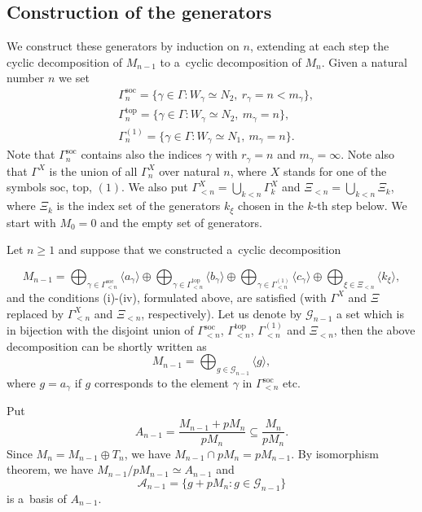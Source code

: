 \documentclass[11pt]{article}
\theoremstyle{definition}
\begin{document}
\subsection{Construction of the generators}

We construct these generators by induction on $n$, extending
at each step the cyclic decomposition of $M_{n-1}$ to a~cyclic decomposition
of $M_n$.
Given a natural number $n$ we set
$$
\begin{aligned}
	&\Gamma_n^{\mathrm{soc}}
	=\{\gamma\in\Gamma:
	W_\gamma\simeq N_2,\ r_\gamma=n<m_\gamma\},\\
	&\Gamma_n^{\mathrm{top}}
	=\{\gamma\in\Gamma:
	W_\gamma\simeq N_2,\ m_\gamma=n\},\\
	&\Gamma_n^{(1)}
	=\{\gamma\in\Gamma:
	W_\gamma\simeq N_1,\ m_\gamma=n\}.
\end{aligned}
$$
Note that $\Gamma_n^{\mathrm{soc}}$ contains also the indices
$\gamma$ with $r_\gamma=n$ and $m_\gamma=\infty$. Note also that $\Gamma^X$ is the union of all $\Gamma^X_n$ over natural $n$, where $X$ stands for one of the symbols $\mathrm{soc}$, $\mathrm{top}$, $(1)$.
	We also put $\Gamma^X_{<n}=\bigcup_{k<n}\Gamma^X_k$ and
	$\Xi_{<n}=\bigcup_{k<n}\Xi_k$, where $\Xi_k$ is the index set of the
	generators $k_\xi$ chosen in the $k$-th step below. 
We start with $M_0=0$ and the empty set of generators.

Let $n\geq1$ and suppose that we constructed a~cyclic
decomposition

$$
		M_{n-1}=\bigoplus_{\gamma\in\Gamma_{<n}^{\mathrm{soc}}}\langle a_{\gamma}\rangle\oplus \bigoplus_{\gamma\in\Gamma_{<n}^{\mathrm{top}}}\langle b_{\gamma}\rangle \oplus \bigoplus_{\gamma\in\Gamma_{<n}^{(1)}}\langle c_{\gamma}\rangle\oplus \bigoplus_{\xi\in\Xi_{<n}}\langle k_{\xi}\rangle,
		$$
		and the conditions (i)-(iv), formulated above, are satisfied (with $\Gamma^X$ and $\Xi$ replaced by $\Gamma^X_{<n}$ and $\Xi_{<n}$, respectively).
	Let us denote by $\mathcal G_{n-1}$ a set which is in bijection with the disjoint union of $\Gamma_{<n}^{\mathrm{soc}}$, $\Gamma_{<n}^{\mathrm{top}}$, $\Gamma_{<n}^{(1)}$ and $\Xi_{<n}$, then the above decomposition can be shortly written as $$
		M_{n-1}=\bigoplus_{g\in\mathcal G_{n-1}}\langle g\rangle,
		$$
		where $g=a_{\gamma}$ if $g$ corresponds to the element $\gamma$ in $\Gamma_{<n}^{\mathrm{soc}}$ etc.


Put
$$
A_{n-1}=\frac{M_{n-1}+pM_n}{pM_n}
\subseteq\frac{M_n}{pM_n}.
$$
Since $M_n=M_{n-1}\oplus T_n$, we have
$M_{n-1}\cap pM_n=pM_{n-1}$. By isomorphism theorem, we have
$M_{n-1}/pM_{n-1}\simeq A_{n-1}$ and
$$
\mathcal A_{n-1}=\{g+pM_n:g\in\mathcal G_{n-1}\}
$$
is a~basis of $A_{n-1}$.
\end{document}
